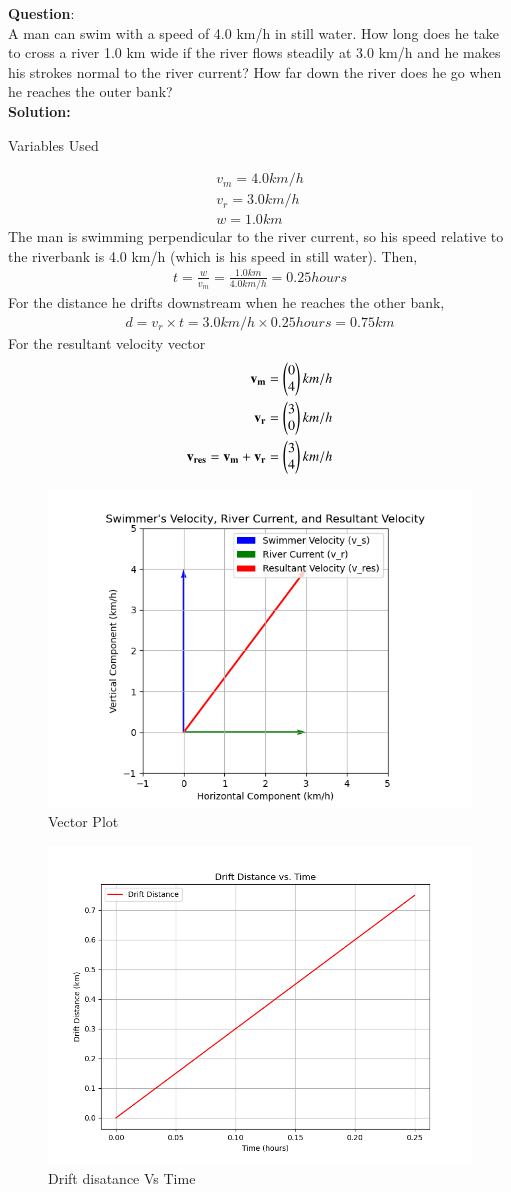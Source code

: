 \documentclass[journal]{IEEEtran}
\begin{document}
\textbf{Question}:\\
A man can swim with a speed of 4.0 km/h in still water. How long does he take to cross a river 1.0 km wide if the river flows steadily at 3.0 km/h and he makes his strokes normal to the river current? How far down the river does he go when he reaches the outer bank? \\
\textbf{Solution: }
\begin{table}[h!]    
  \centering
  
  \caption{Variables Used}
  \label{tab 1.2.26.1}
\end{table}
\begin{align}
	v_{m} = 4.0 km/h \\
	v_{r} = 3.0 km/h \\
	w = 1.0 km
\end{align}
The man is swimming perpendicular to the river current, so his speed relative to the riverbank is 4.0 km/h (which is his speed in still water). Then,
\begin{align}
	t = \frac{w}{v_{m}} = \frac{1.0 km}{4.0 km/h} = 0.25 hours
\end{align}
For the distance he drifts downstream when he reaches the other bank,
\begin{align}
	d = v_{r} \times t = 3.0 km/h \times 0.25 hours = 0.75 km
\end{align}
For the resultant velocity vector
\begin{align}
	\mathbf{v_{m}}=\begin{pmatrix}0 \\ 4\end{pmatrix} km/h \\
	\mathbf{v_{r}}=\begin{pmatrix}3 \\ 0\end{pmatrix} km/h \\
	\mathbf{v_{res}}=\mathbf{v_{m}}+\mathbf{v_{r}}=\begin{pmatrix} 3 \\ 4\end{pmatrix} km/h
\end{align}
\begin{figure}[h!]
   \centering
   \includegraphics[width=0.7\linewidth]{figures/Figure_1.png}
   \caption{Vector Plot}
   \label{vector}
\end{figure}
\begin{figure}[h!]
   \centering
   \includegraphics[width=0.7\linewidth]{figures/Figure_2.png}
   \caption{Drift disatance Vs Time}
   \label{graph}
\end{figure}
\end{document}
